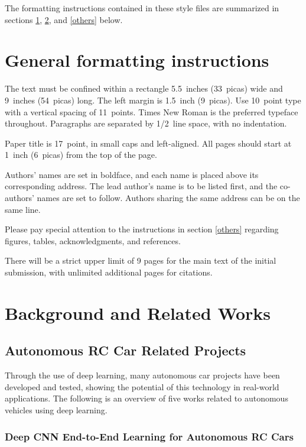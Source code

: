 \documentclass{article} %
\begin{document}
The formatting instructions contained in these style files are summarized in
sections \ref{gen_inst}, \ref{headings}, and \ref{others} below.

\section{General formatting instructions}
\label{gen_inst}

The text must be confined within a rectangle 5.5~inches (33~picas) wide and
9~inches (54~picas) long. The left margin is 1.5~inch (9~picas).
Use 10~point type with a vertical spacing of 11~points. Times New Roman is the
preferred typeface throughout. Paragraphs are separated by 1/2~line space,
with no indentation.

Paper title is 17~point, in small caps and left-aligned.
All pages should start at 1~inch (6~picas) from the top of the page.

Authors' names are
set in boldface, and each name is placed above its corresponding
address. The lead author's name is to be listed first, and
the co-authors' names are set to follow. Authors sharing the
same address can be on the same line.

Please pay special attention to the instructions in section \ref{others}
regarding figures, tables, acknowledgments, and references.


There will be a strict upper limit of 9 pages for the main text of the initial submission, with unlimited additional pages for citations. 

\section{Background and Related Works}
\label{headings}

\subsection{Autonomous RC Car Related Projects}

Through the use of deep learning, many autonomous car projects have been developed and tested, showing the potential of this technology in real-world applications. 
The following is an overview of five works related to autonomous vehicles using deep learning.  


\subsubsection{Deep CNN End-to-End Learning for Autonomous RC Cars \citep{bhutta2023deep}}
\end{document}
